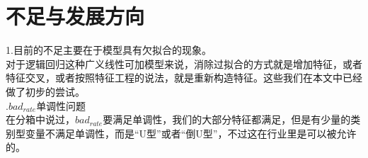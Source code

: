 \documentclass[12pt]{article}
\begin{document}
\section{不足与发展方向}
\begin{flushleft}
	\noindent\qquad 1.目前的不足主要在于模型具有欠拟合的现象。\\
	对于逻辑回归这种广义线性可加模型来说，消除过拟合的方式就是增加特征，或者特征交叉，或者按照特征工程的说法，就是重新构造特征。这些我们在本文中已经做了初步的尝试。\\
	\noindent{}.$bad_{rate}$单调性问题\\
	在分箱中说过，$bad_{rate}$要满足单调性，我们的大部分特征都满足，但是有少量的类别型变量不满足单调性，而是“U型”或者“倒U型”，不过这在行业里是可以被允许的。
\end{flushleft}


 
\end{document}

